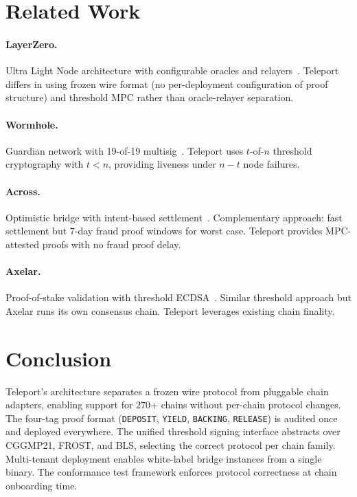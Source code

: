 \documentclass[11pt]{article}
\begin{document}
\section{Related Work}
\label{sec:related}

\paragraph{LayerZero.} Ultra Light Node architecture with configurable oracles and relayers~\cite{layerzero}. Teleport differs in using frozen wire format (no per-deployment configuration of proof structure) and threshold MPC rather than oracle-relayer separation.

\paragraph{Wormhole.} Guardian network with 19-of-19 multisig~\cite{wormhole}. Teleport uses $t$-of-$n$ threshold cryptography with $t < n$, providing liveness under $n - t$ node failures.

\paragraph{Across.} Optimistic bridge with intent-based settlement~\cite{across}. Complementary approach: fast settlement but 7-day fraud proof windows for worst case. Teleport provides MPC-attested proofs with no fraud proof delay.

\paragraph{Axelar.} Proof-of-stake validation with threshold ECDSA~\cite{axelar}. Similar threshold approach but Axelar runs its own consensus chain. Teleport leverages existing chain finality.

\section{Conclusion}
\label{sec:conclusion}

Teleport's architecture separates a frozen wire protocol from pluggable chain adapters, enabling support for 270+ chains without per-chain protocol changes. The four-tag proof format (\texttt{DEPOSIT}, \texttt{YIELD}, \texttt{BACKING}, \texttt{RELEASE}) is audited once and deployed everywhere. The unified threshold signing interface abstracts over CGGMP21, FROST, and BLS, selecting the correct protocol per chain family. Multi-tenant deployment enables white-label bridge instances from a single binary. The conformance test framework enforces protocol correctness at chain onboarding time.
\end{document}

